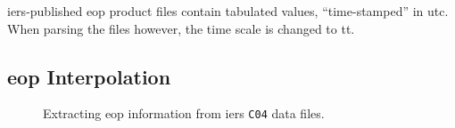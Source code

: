 \begin{warning}
\gls{iers}-published \gls{eop} product files contain tabulated values, ``time-stamped'' 
in \gls{utc}. When parsing the files however, the time scale is changed to \gls{tt}.
\end{warning}

\subsection{\gls{eop} Interpolation}\label{ssec:eop-interpolation}

\begin{figure}
  \centering
  
  \caption{Extracting \gls{eop} information from \gls{iers} \texttt{C04} data files.}
  \label{fig:handling-eop}
\end{figure}

